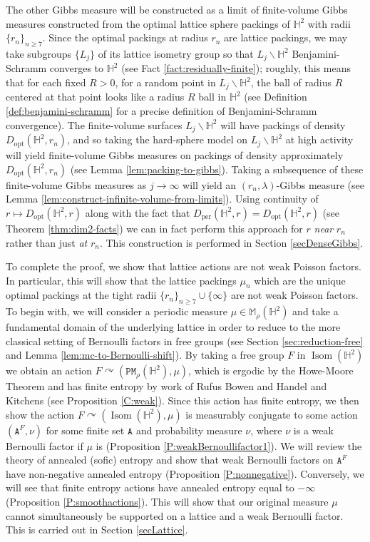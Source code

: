 \documentclass[11pt]{amsart}
\theoremstyle{definition}
\theoremstyle{remark}
\renewcommand{\H}{\mathbb{H}}
\newcommand{\M}{\mathbb{M}}
\newcommand{\cP}{\mathtt{PM}}
\newcommand{\Isom}{\operatorname{Isom}}
\newcommand{\opt}{\operatorname{opt}}
\newcommand{\per}{\operatorname{per}}
\newcommand{\Dopt}{D_{\opt}}
\def\cc{{\curvearrowright}}
\begin{document}
The other Gibbs measure will be constructed as a limit of finite-volume Gibbs measures constructed from the optimal lattice sphere packings of $\H^2$ with radii $\{ r_n \}_{n \ge 7}$.  Since the optimal packings at radius $r_n$ are lattice packings, we may take subgroups $\{L_j\}$ of its lattice isometry group so that $L_j\backslash \H^2 $ Benjamini-Schramm converges to $\H^2$ (see Fact \ref{fact:residually-finite}); roughly, this means that for each fixed $R > 0$, for a random point in $L_j \backslash \H^2$, the ball of radius $R$ centered at that point looks like a radius $R$ ball in $\H^2$ (see Definition \ref{def:benjamini-schramm} for a precise definition of Benjamini-Schramm convergence).  The finite-volume surfaces $L_j \backslash \H^2$ will have packings of density $\Dopt(\H^2,r_n)$, and so taking the hard-sphere model on $L_j \backslash \H^2 $ at high activity will yield finite-volume Gibbs measures on packings of density approximately $\Dopt(\H^2,r_n)$ (see Lemma \ref{lem:packing-to-gibbs}).  Taking a subsequence of these finite-volume Gibbs measures as $j \to \infty$ will yield an $(r_n,\lambda)$-Gibbs measure (see Lemma \ref{lem:construct-infinite-volume-from-limits}).  Using continuity of $r \mapsto \Dopt(\H^2, r)$ along with the fact that $D_{\per}(\H^2,r) = \Dopt(\H^2,r)$ (see Theorem \ref{thm:dim2-facts}) we can in fact perform this approach for $r$ \emph{near} $r_n$ rather than just \emph{at} $r_n$.  This construction is performed in Section \ref{secDenseGibbs}.

To complete the proof, we show that lattice actions are not weak Poisson factors.  In particular, this will show that the lattice packings $\mu_n$  which are the unique optimal packings at the {tight} radii $\{r_n\}_{n \geq 7} \cup \{\infty\}$ are not weak Poisson factors.  To begin with, we will consider a periodic measure $\mu \in \M_\rho(\H^2)$ and take a fundamental domain of the underlying lattice in order to reduce to the more classical setting of Bernoulli factors in free groups (see Section \ref{sec:reduction-free} and Lemma \ref{lem:mc-to-Bernoulli-shift}).  By taking a free group $F$ in $\Isom(\H^2)$ we obtain an  action $F \cc (\cP_\rho(\H^2),\mu)$, which is ergodic by the Howe-Moore Theorem and has finite entropy by work of Rufus Bowen and Handel and Kitchens (see Proposition \ref{C:weak}).  Since this action has finite entropy, we then show the action $F \cc (\Isom(\H^2),\mu)$ is measurably conjugate to some action $(\mathtt{A}^F,\nu)$ for some finite set $\mathtt{A}$ and probability measure $\nu$, where $\nu$ is a weak Bernoulli factor if $\mu$ is (Proposition \ref{P:weakBernoullifactor1}).   We will review the theory of annealed (sofic) entropy and show that weak Bernoulli factors on $\mathtt{A}^F$ have non-negative annealed entropy (Proposition \ref{P:nonnegative}).  Conversely, we will see that finite entropy actions have annealed entropy equal to $-\infty$ (Proposition \ref{P:smoothactions}).  This will show that our original measure $\mu$ cannot simultaneously be supported on a lattice and a weak Bernoulli factor.  This is carried out in Section \ref{secLattice}.
\end{document}
